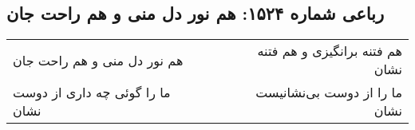\begin{center}
\section*{رباعی شماره ۱۵۲۴: هم نور دل منی و هم راحت جان}
\label{sec:1524}
\begin{longtable}{l p{0.5cm} r}
هم نور دل منی و هم راحت جان
&&
هم فتنه برانگیزی و هم فتنه نشان
\\
ما را گوئی چه داری از دوست نشان
&&
ما را از دوست بی‌نشانیست نشان
\\
\end{longtable}
\end{center}
